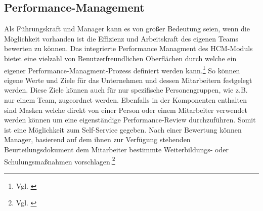 \subsection{Performance-Management}
Als Führungskraft und Manager kann es von großer Bedeutung seien, wenn die Möglichkeit vorhanden ist die Effizienz und Arbeitskraft des eigenen Teams bewerten zu können. Das integrierte Performance Managment des HCM-Moduls bietet eine vielzahl von Benutzerfreundlichen Oberflächen durch welche ein eigener Performance-Managment-Prozess definiert werden kann.\footnote{Vgl. \cite{SAPSE2024d}} So können eigene Werte und Ziele für das Unternehmen und dessen Mitarbeitern festgelegt werden. Diese Ziele können auch für nur spezifische Personengruppen, wie z.B. nur einem Team, zugeordnet werden. Ebenfalls in der Komponenten enthalten sind Masken welche direkt von einer Person oder einem Mitarbeiter verwendet werden können um eine eigenständige Performance-Review durchzuführen. Somit ist eine Möglichkeit zum Self-Service gegeben. Nach einer Bewertung können Manager, basierend auf dem ihnen zur Verfügung stehenden Beurteilungsdokument dem Mitarbeiter bestimmte Weiterbildungs- oder Schulungsmaßnahmen vorschlagen.\footnote{Vgl. \cite{SAPSE2024d}} 

\newpage